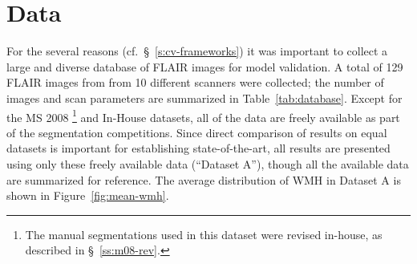 \section{Data}\label{s:data}
For the several reasons (cf.~\S~\ref{s:cv-frameworks})
it was important to collect a large and diverse database of FLAIR images for model validation.
A total of 129 FLAIR images from from 10 different scanners were collected;
the number of images and scan parameters are summarized in Table~\ref{tab:database}.
Except for the MS 2008%
\footnote{The manual segmentations used in this dataset were revised in-house,
  as described in \S~\ref{ss:m08-rev}.}
and In-House datasets,
all of the data are freely available as part of the segmentation competitions.
Since direct comparison of results on equal datasets is important for establishing state-of-the-art,
all results are presented using only these freely available data (``Dataset A''),
though all the available data are summarized for reference.
The average distribution of WMH in Dataset A is shown in Figure~\ref{fig:mean-wmh}.
\par
